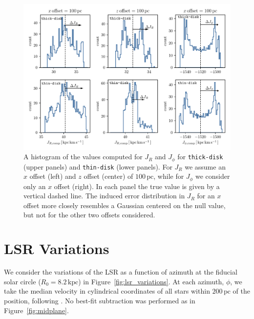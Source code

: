 \documentclass[twocolumn]{aastex62}
\newcommand{\pc}{\text{pc}}
\newcommand{\kpc}{\text{kpc}}
\newcommand{\thin}{\texttt{thin-disk}}
\newcommand{\thick}{\texttt{thick-disk}}
\begin{document}
\begin{figure}
\begin{center}
\includegraphics[width=7.10000594991in]{fig/schmactions_Jphi_JR_hist.pdf}
\end{center}
\caption{A histogram of the values computed for $J_R$ and $J_{\phi}$ for
\thick{} (upper panels) and \thin{} (lower panels). For $J_R$ we assume an
$x$ offset (left) and $z$ offset (center) of $100\,\pc$, while for $J_{\phi}$
we consider only an $x$ offset (right). In each panel the true value is given
by a vertical dashed line. The induced error distribution in $J_R$ for an $x$
offset more closely resembles a Gaussian centered on the null value, but not
for the other two offsets considered.}
\label{fig:Jphi_JR_hist}
\end{figure}

\section{LSR Variations} \label{app:lsr}
We consider the variations of the LSR as a function of azimuth at the fiducial
solar circle ($R_{0} = 8.2\,\kpc$) in Figure~\ref{fig:lsr_variations}. At each
azimuth, $\phi$, we take the median velocity in cylindrical coordinates of all
stars within $200\,\pc$ of the position, following
\citet{2018arXiv180610564S}. No best-fit subtraction was performed as in
Figure~\ref{fig:midplane}.
\end{document}
